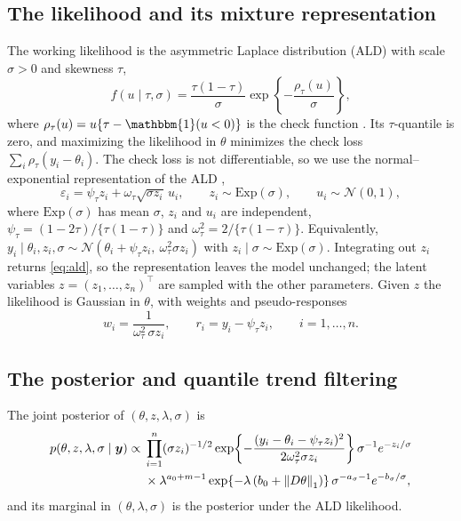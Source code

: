 \subsection{The likelihood and its mixture representation}
\label{subsec:likelihood}

The working likelihood is the asymmetric Laplace distribution (ALD) with scale $\sigma > 0$ and skewness $\tau$,
\begin{equation}
    f(u \mid \tau, \sigma) = \frac{\tau(1-\tau)}{\sigma}
    \exp\!\left\{-\frac{\rho_\tau(u)}{\sigma}\right\},
    \label{eq:ald}
\end{equation}
where $\rho_\tau(u) = u\{\tau - \mathbbm{1}(u < 0)\}$ is the check function \citep{koenker1978regression}. Its $\tau$-quantile is zero, and maximizing the likelihood in $\theta$ minimizes the check loss $\sum_i \rho_\tau(y_i-\theta_i)$. The check loss is not differentiable, so we use the normal--exponential representation of the ALD \citep{kozumi2011gibbs},
\begin{equation}
    \varepsilon_i = \psi_\tau z_i + \omega_\tau \sqrt{\sigma z_i}\, u_i, \qquad z_i \sim \mathrm{Exp}(\sigma), \qquad u_i \sim \mathcal{N}(0,1),
    \label{eq:ald_mixture}
\end{equation}
where $\mathrm{Exp}(\sigma)$ has mean $\sigma$, $z_i$ and $u_i$ are independent, $\psi_\tau = (1-2\tau)/\{\tau(1-\tau)\}$ and $\omega_\tau^2 = 2/\{\tau(1-\tau)\}$. Equivalently, $y_i \mid \theta_i, z_i, \sigma \sim \mathcal{N}(\theta_i + \psi_\tau z_i,\ \omega_\tau^2 \sigma z_i)$ with $z_i \mid \sigma \sim \mathrm{Exp}(\sigma)$. Integrating out $z_i$ returns \eqref{eq:ald}, so the representation leaves the model unchanged; the latent variables $z = (z_1,\ldots,z_n)^\top$ are sampled with the other parameters. Given $z$ the likelihood is Gaussian in $\theta$, with weights and pseudo-responses
\begin{equation}
    w_i = \frac{1}{\omega_\tau^2\, \sigma z_i}, \qquad r_i = y_i - \psi_\tau z_i, \qquad i = 1,\ldots,n.
    \label{eq:weights}
\end{equation}

\subsection{The posterior and quantile trend filtering}
\label{subsec:posterior}

The joint posterior of $(\theta, z, \lambda, \sigma)$ is
\begin{equation}
\begin{aligned}
    p(\theta, z, \lambda, \sigma \mid \bm{y}) \propto{} & \prod_{i=1}^n (\sigma z_i)^{-1/2} \exp\!\left\{-\frac{(y_i-\theta_i-\psi_\tau z_i)^2}{2\omega_\tau^2 \sigma z_i}\right\} \sigma^{-1} e^{-z_i/\sigma} \\
    & \times \lambda^{a_0 + m - 1} \exp\!\left\{-\lambda\left(b_0 + \left\lVert D\theta\right\rVert_1\right)\right\} \sigma^{-a_\sigma - 1} e^{-b_\sigma/\sigma},
\end{aligned}
    \label{eq:posterior}
\end{equation}
and its marginal in $(\theta, \lambda, \sigma)$ is the posterior under the ALD likelihood.

